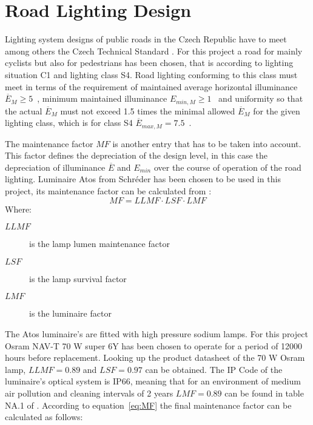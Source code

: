 \section{Road Lighting Design}
\label{sec:Road_Lighting_Design}
Lighting system designs of public roads in the Czech Republic have to meet among others the Czech Technical Standard \cite{CSN_EN_13201-2}. For this project a road for mainly cyclists but also for pedestrians has been chosen, that is according to \cite{CSN_EN_13201-1} lighting situation C1 and lighting class S4. Road lighting conforming to this class must meet in terms of \cite{CSN_EN_13201-2} the requirement of maintained average horizontal illuminance $\overline{E}_{M}\geq 5$~, minimum maintained illuminance $E_{min,M}\geq 1$~ and uniformity so that the actual $\overline{E}_{M}$ must not exceed 1.5 times the minimal allowed $\overline{E}_{M}$ for the given lighting class, which is for class S4 $\overline{E}_{max,M} = 7.5$~.

The maintenance factor $MF$ is another entry that has to be taken into account. This factor defines the depreciation of the design level, in this case the depreciation of illuminance $\overline{E}$ and $E_{min}$ over the course of operation of the road lighting. Luminaire Atos from Schr\'{e}der has been chosen to be used in this project, its maintenance factor can be calculated from \cite{CSN_EN_13201-2_Z1}:
\begin{equation} \label{eq:MF}
MF = LLMF \cdot LSF \cdot LMF
\end{equation}
Where:
\begin{description}
	\item[$LLMF$] is the lamp lumen maintenance factor
	\item[$LSF$] is the lamp survival factor
	\item[$LMF$] is the luminaire factor
\end{description}

The Atos luminaire's are fitted with high pressure sodium lamps. For this project Osram NAV-T 70 W super 6Y has been chosen to operate for a period of 12000 hours before replacement. Looking up the product datasheet \cite{Osram} of the 70 W Osram lamp, $LLMF=0.89$ and $LSF=0.97$ can be obtained. The IP Code of the luminaire's optical system is IP66, meaning that for an environment of medium air pollution and cleaning intervals of 2 years $LMF=0.89$ can be found in table NA.1 of \cite{CSN_EN_13201-2_Z1}. According to equation~\ref{eq:MF} the final maintenance factor can be calculated as follows:


